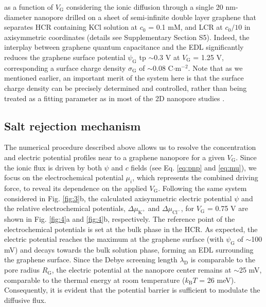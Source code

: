 \documentclass[journal=langd5,email=true, hyperref=true, keywords=false]{achemso}
\newcommand{\Fig}{Fig.}
\begin{document}
as a function of $V_{\mathrm{G}}$ considering the ionic diffusion
through a single 20 nm-diameter nanopore drilled on a sheet of
semi-infinite double layer graphene that separates HCR containing KCl
solution at $c_{0}$ = 0.1 mM, and LCR at $c_{0}/10$ in axisymmetric
coordinates (details see Supplementary Section S5). Indeed, the
interplay between graphene quantum capacitance and the EDL
significantly reduces the graphene surface potential
$\psi_{\mathrm{G}}$ tp $\sim$0.3 V at $V_{\mathrm{G}}$ = 1.25 V,
corresponding a surface charge density $\sigma_{\mathrm{G}}$ of
$\sim$0.08 C$\cdot$m$^{-2}$. Note that as we mentioned earlier, an
important merit of the system here is that the surface charge density
can be precisely determined and controlled, rather than being treated
as a fitting parameter as in most of the 2D nanopore studies
\cite{Rollings_2016}.

\subsection{Salt rejection mechanism}
\label{sec:mechanism}
The numerical procedure described above allows us to resolve the
concentration and electric potential profiles near to a graphene
nanopore for a given $V_{\mathrm{G}}$. Since the ionic flux is driven
by both $\psi$ and $c$ fields (see Eq. \ref{eq:pnp} and \ref{eq:mu}),
we focus on the electrochemical potential $\mu_{i}$, which represents
the combined driving force, to reveal its dependence on the applied
$V_{\mathrm{G}}$. Following the same system considered in \Fig{}
\ref{fig:3}b, the calculated axisymmetric electric potential $\psi$
and the relative electrochemical potentials,
$\Delta \mu_{\mathrm{K^{+}}}$ and $\Delta \mu_{\mathrm{Cl^{-}}}$, for
$V_{\mathrm{G}}$ = 0.75 V are shown in \Fig{} \ref{fig:4}a and
\ref{fig:4}b, respectively. The reference point of the electrochemical
potentials is set at the bulk phase in the HCR. As expected, the
electric potential reaches the maximum at the graphene surface (with
$\psi_{\mathrm{G}}$ of $\sim$100 mV) and decays towards the bulk
solution phase, forming an EDL surrounding the graphene surface. Since
the Debye screening length $\lambda_{\mathrm{D}}$ is comparable to the
pore radius $R_{\mathrm{G}}$, the electric potential at the nanopore
center remains at $\sim$25 mV, comparable to the thermal energy at
room temperature ($k_{\mathrm{B}}T$ = 26 meV). Consequently, it is
evident that the potential barrier is sufficient to modulate the
diffusive flux.
\end{document}
